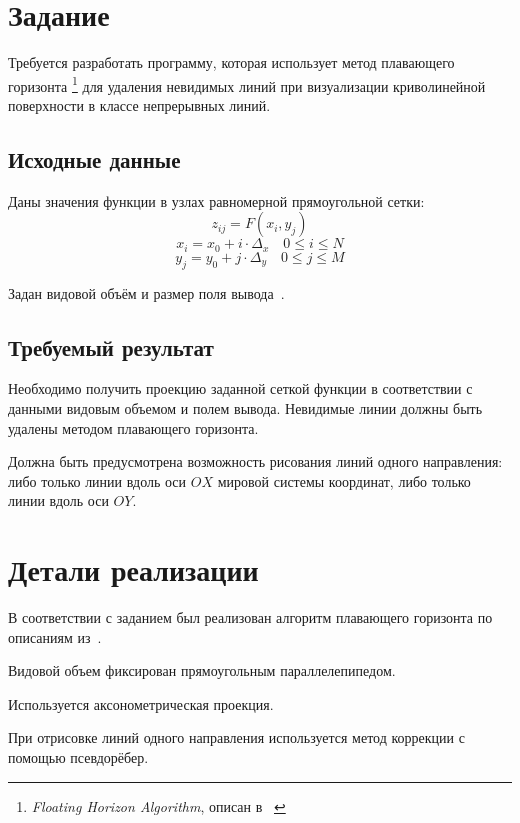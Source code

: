 \documentclass[a4paper,10pt]{article}
\begin{document}




\section{Задание}
Требуется разработать программу, которая использует метод плавающего горизонта%
\footnote{\textit{Floating Horizon Algorithm}, описан в~%
\cite{rogers1989procelemsforcg, shikin1995cg, skala1985bresenhemmodif, ilyin2006task1}}
для удаления невидимых линий при визуализации криволинейной поверхности в классе непрерывных линий.

\subsection{Исходные данные}
Даны значения функции в узлах равномерной прямоугольной сетки:
$$ z_{ij} = F(x_i, y_j) $$
$$ x_i = x_0 + i \cdot \Delta_x \quad 0 \leqslant i \leqslant N $$
$$ y_j = y_0 + j \cdot \Delta_y \quad 0 \leqslant j \leqslant M $$

Задан видовой объём и размер поля вывода~\cite{ilyin2006task1}.

\subsection{Требуемый результат}
Необходимо получить проекцию заданной сеткой функции в соответствии с данными видовым объемом и полем вывода.
Невидимые линии должны быть удалены методом плавающего горизонта.

Должна быть предусмотрена возможность рисования линий одного направления: 
либо только линии вдоль оси $OX$ мировой системы координат, 
либо только линии вдоль оси $OY$.

\section{Детали реализации}
В соответствии с заданием был реализован алгоритм плавающего горизонта 
по описаниям из~\cite{rogers1989procelemsforcg, shikin1995cg, skala1985bresenhemmodif, ilyin2006task1}.

Видовой объем фиксирован прямоугольным параллелепипедом. 

Используется аксонометрическая проекция.

При отрисовке линий одного направления используется метод коррекции с помощью псевдорёбер.
\end{document}
